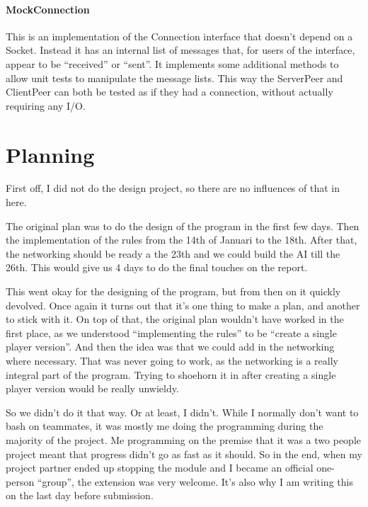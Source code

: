 \documentclass[12pt, letterpaper]{article}
\begin{document}
    \paragraph{MockConnection}
    This is an implementation of the Connection interface that doesn't depend on a Socket.
    Instead it has an internal list of messages that, for users of the interface, appear to be ``received'' or ``sent''.
    It implements some additional methods to allow unit tests to manipulate the message lists.
    This way the ServerPeer and ClientPeer can both be tested as if they had a connection, without actually requiring
    any I/O.


    \section{Planning}
    \label{sec:planning}

    First off, I did not do the design project, so there are no influences of that in here.

    The original plan was to do the design of the program in the first few days.
    Then the implementation of the rules from the 14th of Januari to the 18th.
    After that, the networking should be ready a the 23th and we could build the AI till the 26th.
    This would give us 4 days to do the final touches on the report.

    This went okay for the designing of the program, but from then on it quickly devolved.
    Once again it turns out that it's one thing to make a plan, and another to stick with it.
    On top of that, the original plan wouldn't have worked in the first place, as we understood
    ``implementing the rules'' to be ``create a single player version''.
    And then the idea was that we could add in the networking where necessary.
    That was never going to work, as the networking is a really integral part of the program.
    Trying to shoehorn it in after creating a single player version would be really unwieldy.

    So we didn't do it that way.
    Or at least, I didn't.
    While I normally don't want to bash on teammates, it was mostly me doing the programming during the majority of the
    project.
    Me programming on the premise that it was a two people project meant that progress didn't go as fast as it should.
    So in the end, when my project partner ended up stopping the module and I became an official one-person ``group'',
    the extension was very welcome.
    It's also why I am writing this on the last day before submission.
\end{document}
